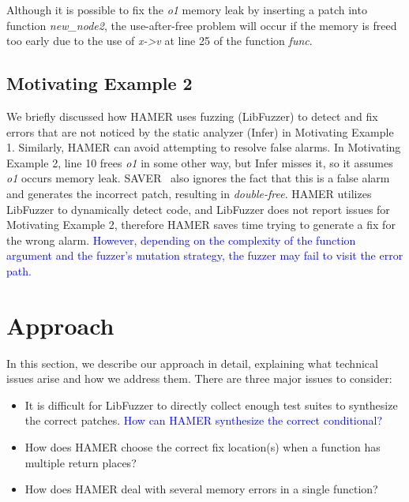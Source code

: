 \documentclass[a4j,dvipdfmx]{article}
\begin{document}
Although it is possible to fix the  {\it o1} memory leak by inserting a patch into function  {\it new\_node2}, the use-after-free problem will occur if the memory is freed too early due to the use of  {\it x->v} at line 25 of the function  {\it func}.




\subsection{Motivating Example 2}
We briefly discussed how HAMER uses fuzzing (LibFuzzer) to detect and fix errors that are not noticed by the static analyzer (Infer) in Motivating Example 1. Similarly, HAMER can avoid attempting to resolve false alarms. In Motivating Example 2, line 10 frees {\it o1} in some other way, but Infer misses it, so it assumes {\it o1} occurs memory leak. SAVER~\cite{SAVER} also ignores the fact that this is a false alarm and generates the incorrect patch, resulting in {\it double-free}. HAMER utilizes LibFuzzer to dynamically detect code, and LibFuzzer does not report issues for Motivating Example 2, therefore HAMER saves time trying to generate a fix for the wrong alarm. \textcolor{blue}{However, depending on the complexity of the function argument and the fuzzer's mutation strategy, the fuzzer may fail to visit the error path.}
\section{Approach}
\label{approach}
In this section, we describe our approach in detail, explaining what technical issues arise and how we address them. There are three major issues to consider:
\begin{itemize}
\item It is difficult for LibFuzzer to directly collect enough test suites to synthesize the correct patches. \textcolor{blue}{How can HAMER synthesize the correct conditional?}
\item How does HAMER choose the correct fix location(s) when a function has multiple return places?
\item How does HAMER deal with several memory errors in a single function?
\end{itemize}
\end{document}
